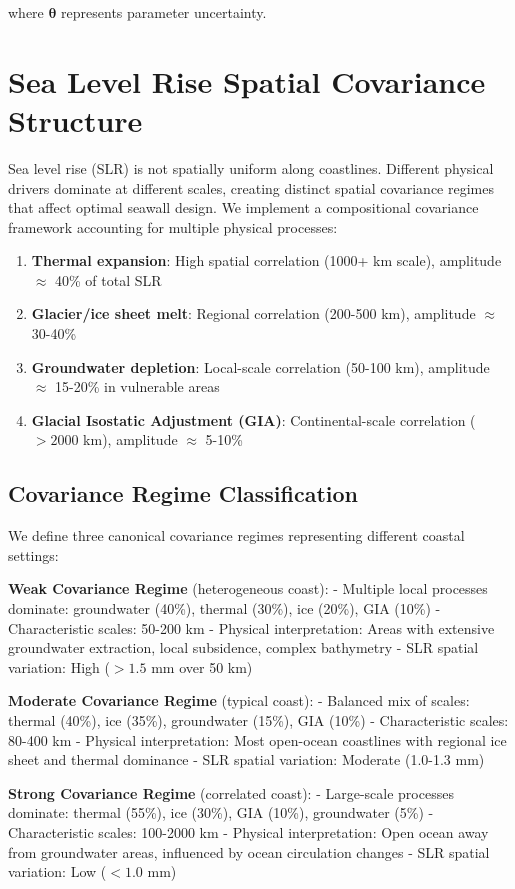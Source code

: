 \documentclass[review]{elsarticle}
\begin{document}
where $\boldsymbol{\theta}$ represents parameter uncertainty.

\section{Sea Level Rise Spatial Covariance Structure}

Sea level rise (SLR) is not spatially uniform along coastlines. Different physical drivers dominate at different scales, creating distinct spatial covariance regimes that affect optimal seawall design. We implement a compositional covariance framework accounting for multiple physical processes:

\begin{enumerate}
\item \textbf{Thermal expansion}: High spatial correlation (1000+ km scale), amplitude $\approx$ 40\% of total SLR
\item \textbf{Glacier/ice sheet melt}: Regional correlation (200-500 km), amplitude $\approx$ 30-40\%
\item \textbf{Groundwater depletion}: Local-scale correlation (50-100 km), amplitude $\approx$ 15-20\% in vulnerable areas
\item \textbf{Glacial Isostatic Adjustment (GIA)}: Continental-scale correlation ($>2000$ km), amplitude $\approx$ 5-10\%
\end{enumerate}

\subsection{Covariance Regime Classification}

We define three canonical covariance regimes representing different coastal settings:

\textbf{Weak Covariance Regime} (heterogeneous coast):
- Multiple local processes dominate: groundwater (40\%), thermal (30\%), ice (20\%), GIA (10\%)
- Characteristic scales: 50-200 km
- Physical interpretation: Areas with extensive groundwater extraction, local subsidence, complex bathymetry
- SLR spatial variation: High ($>1.5$ mm over 50 km)

\textbf{Moderate Covariance Regime} (typical coast):
- Balanced mix of scales: thermal (40\%), ice (35\%), groundwater (15\%), GIA (10\%)
- Characteristic scales: 80-400 km
- Physical interpretation: Most open-ocean coastlines with regional ice sheet and thermal dominance
- SLR spatial variation: Moderate (1.0-1.3 mm)

\textbf{Strong Covariance Regime} (correlated coast):
- Large-scale processes dominate: thermal (55\%), ice (30\%), GIA (10\%), groundwater (5\%)
- Characteristic scales: 100-2000 km
- Physical interpretation: Open ocean away from groundwater areas, influenced by ocean circulation changes
- SLR spatial variation: Low ($<1.0$ mm)
\end{document}
